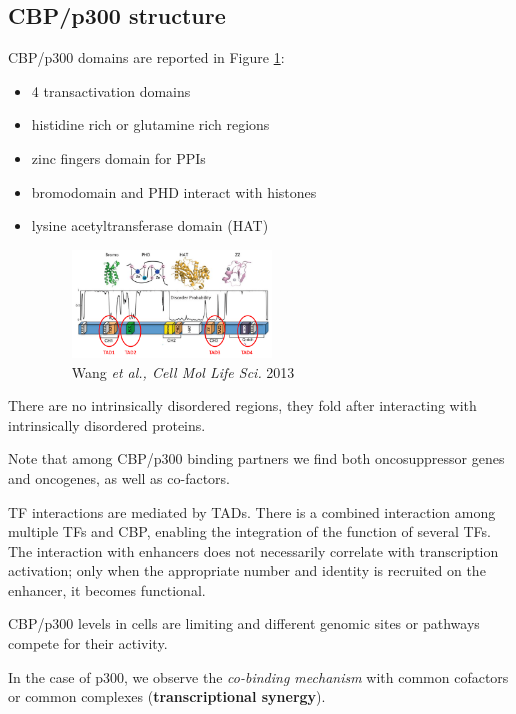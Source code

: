\hypertarget{crepp300-structure}{%
\subsection{CBP/p300 structure}\label{crepp300-structure}}
CBP/p300 domains are reported in Figure \ref{fig:cbp_domain}:
\begin{itemize}
\item
  4 transactivation domains
\item
  histidine rich or glutamine rich regions
\item
  zinc fingers domain for PPIs
\item
  bromodomain and PHD interact with histones
\item
  lysine acetyltransferase domain (HAT)

  \begin{figure}
  \centering
  \includegraphics[width=0.5\textwidth]{../_resources/Screenshot_2022-10-12_at_08-56-06.png}
  \caption{Wang \emph{et al., Cell Mol Life Sci.} 2013}
  \label{fig:cbp_domain}
  \end{figure}

\end{itemize}

There are no intrinsically disordered regions, they fold after interacting with intrinsically disordered proteins.

Note that among CBP/p300 binding partners we find both oncosuppressor genes and oncogenes, as well as co-factors.

TF interactions are mediated by TADs. There is a combined interaction among multiple TFs and CBP, enabling the integration of the function of several TFs. The interaction with enhancers does not necessarily correlate with transcription activation; only when the appropriate number and identity is recruited on the enhancer, it becomes functional.

CBP/p300 levels in cells are limiting and different genomic sites or pathways compete for their activity.

In the case of p300, we observe the \emph{co-binding mechanism} with common cofactors or common complexes (\textbf{transcriptional synergy}).

